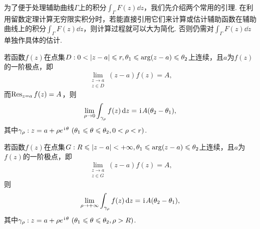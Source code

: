 为了便于处理辅助曲线\(\Gamma\)上的积分\(\int_{\Gamma} F(z) \dd{z}\)，我们先介绍两个常用的引理.
在利用留数定理计算无穷限实积分时，若能直接引用它们来计算或估计辅助函数在辅助曲线上的积分\(\int_{\Gamma} F(z) \dd{z}\)，则计算过程就可以大为简化.
否则仍需对\(\int_{\Gamma} F(z) \dd{z}\)单独作具体的估计.

\begin{lemma}\label{theorem:留数定理.计算积分路径上没有奇点的无穷限积分.引理1}
若函数\(f(z)\)在点集\(D: 0<\abs{z-a}\leqslant r, \theta_1 \leqslant \arg(z-a) \leqslant \theta_2\)上连续，且\(a\)为\(f(z)\)的一阶极点，即\begin{equation}
\lim\limits_{\substack{z \to a \\ z \in D}} (z-a) f(z) = A,
\end{equation}
而\(\operatorname{Res}_{z=a} f(z) = A\)，则\begin{equation}
\lim\limits_{\rho\to0} \int_{\gamma_{\rho}} f(z) \dd{z} = \kern1pt\mathrm{i}\kern1pt A (\theta_2-\theta_1),
\end{equation}
其中\(\gamma_{\rho}: z=a+\rho e^{\kern1pt\mathrm{i}\kern1pt\theta}\ (\theta_1 \leqslant \theta \leqslant \theta_2, 0 < \rho < r)\).

若函数\(f(z)\)在点集\(G: R \leqslant \abs{z-a} < +\infty, \theta_1 \leqslant \arg(z-a) \leqslant \theta_2\)上连续，且\(a\)为\(f(z)\)的一阶极点，即\begin{equation}
\lim\limits_{\substack{z \to a \\ z \in G}} (z-a) f(z) = A,
\end{equation}则\begin{equation}
\lim\limits_{\rho\to+\infty} \int_{\gamma_{\rho}} f(z) \dd{z} = \kern1pt\mathrm{i}\kern1pt A (\theta_2-\theta_1),
\end{equation}
其中\(\gamma_{\rho}: z=a+\rho e^{\kern1pt\mathrm{i}\kern1pt\theta}\ (\theta_1 \leqslant \theta \leqslant \theta_2, \rho > R)\).
\end{lemma}

